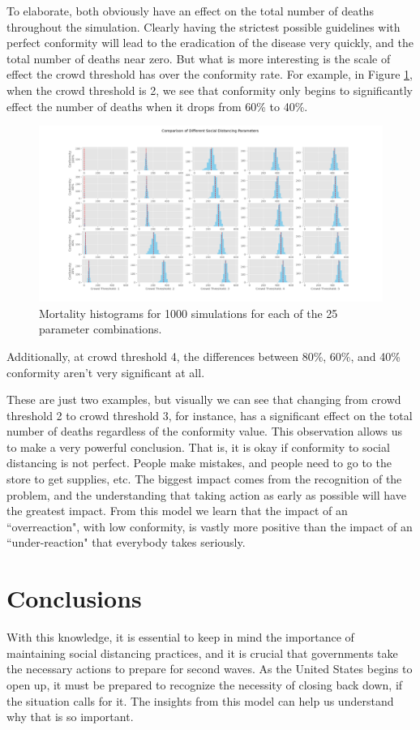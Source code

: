 \documentclass[12pt]{article}
\begin{document}
\begin{multicols}{2}
To elaborate, both obviously have an effect on the total number of deaths throughout the simulation.
Clearly having the strictest possible guidelines with perfect conformity will lead to the eradication of the disease very quickly, and the total number of deaths near zero.
But what is more interesting is the scale of effect the crowd threshold has over the conformity rate.
For example, in Figure \ref{hist}, when the crowd threshold is 2, we see that conformity only begins to significantly effect the number of deaths when it drops from 60\% to 40\%. 
\begin{figure}[hbt!]
 \centering
 \includegraphics[width=\textwidth]{5000-1000.png}
 \caption{Mortality histograms for 1000 simulations for each of the 25 parameter combinations.}
 \label{hist}
\end{figure}
Additionally, at crowd threshold 4, the differences between 80\%, 60\%, and 40\% conformity aren't very significant at all.

These are just two examples, but visually we can see that changing from crowd threshold 2 to crowd threshold 3, for instance, has a significant effect on the total number of deaths regardless of the conformity value.
This observation allows us to make a very powerful conclusion.
That is, it is okay if conformity to social distancing is not perfect.
People make mistakes, and people need to go to the store to get supplies, etc.
The biggest impact comes from the recognition of the problem, and the understanding that taking action as early as possible will have the greatest impact.
From this model we learn that the impact of an ``overreaction", with low conformity, is vastly more positive than the impact of an ``under-reaction" that everybody takes seriously.

\section{Conclusions}
With this knowledge, it is essential to keep in mind the importance of maintaining social distancing practices, and it is crucial that governments take the necessary actions to prepare for second waves.
As the United States begins to open up, it must be prepared to recognize the necessity of closing back down, if the situation calls for it.
The insights from this model can help us understand why that is so important.


\end{multicols}
\end{document}
